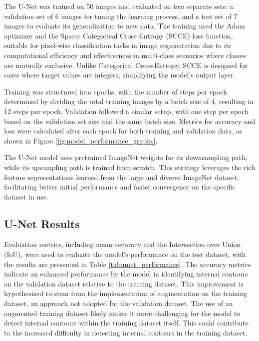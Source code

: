 \documentclass{ieeeaccess}
\begin{document}
The U-Net was trained on 50 images and evaluated on two separate sets: a validation set of 6 images for tuning the learning process, and a test set of 7 images to evaluate its generalization to new data. The training used the Adam optimizer and the Sparse Categorical Cross-Entropy (SCCE) loss function, suitable for pixel-wise classification tasks in image segmentation due to its computational efficiency and effectiveness in multi-class scenarios where classes are mutually exclusive. Unlike Categorical Cross-Entropy, SCCE is designed for cases where target values are integers, simplifying the model's output layer.

Training was structured into epochs, with the number of steps per epoch determined by dividing the total training images by a batch size of 4, resulting in 12 steps per epoch. Validation followed a similar setup, with one step per epoch based on the validation set size and the same batch size. Metrics for accuracy and loss were calculated after each epoch for both training and validation data, as shown in Figure \ref{fig:model_performance_graphs}.

The U-Net model uses pretrained ImageNet weights for its downsampling path, while its upsampling path is trained from scratch. This strategy leverages the rich feature representations learned from the large and diverse ImageNet dataset, facilitating better initial performance and faster convergence on the specific dataset in use.


\subsection{\textbf{U-Net Results}}
\label{Subsec: U-Net Results}

Evaluation metrics, including mean accuracy and the Intersection over Union (IoU), were used to evaluate the model's performance on the test dataset, with the results are presented in Table \ref{tab:unet_performance}. The accuracy metrics indicate an enhanced performance by the model in identifying internal contours on the validation dataset relative to the training dataset. This improvement is hypothesized to stem from the implementation of augmentation on the training dataset, an approach not adopted for the validation dataset. The use of an augmented training dataset likely makes it more challenging for the model to detect internal contours within the training dataset itself. This could contribute to the increased difficulty in detecting internal contours in the training dataset.
\end{document}
